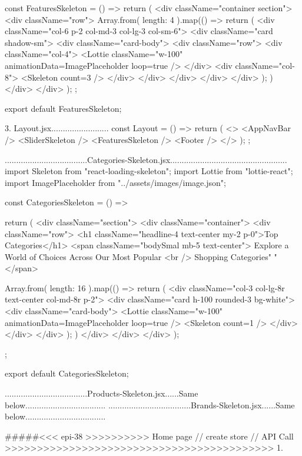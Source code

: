 const FeaturesSkeleton = () => {
  return (
    <div className="container section">
      <div className="row">
        {Array.from({ length: 4 }).map(() => {
          return (
            <div className="col-6 p-2 col-md-3 col-lg-3 col-sm-6">
              <div className="card shadow-sm">
                <div className="card-body">
                  <div className="row">
                    <div className="col-4">
                      <Lottie
                        className="w-100"
                        animationData={ImagePlaceholder}
                        loop={true}
                      />
                    </div>
                    <div className="col-8">
                      <Skeleton count={3} />
                    </div>
                  </div>
                </div>
              </div>
            </div>
          );
        })}
      </div>
    </div>
  );
};

export default FeaturesSkeleton;

3. Layout.jsx.........................
const Layout = () => {
  return (
    <>
      <AppNavBar />
      <SliderSkeleton />
      <FeaturesSkeleton />
      <Footer />
    </>
  );
};

....................................Categories-Skeleton.jsx...................................................
import Skeleton from "react-loading-skeleton";
import Lottie from "lottie-react";
import ImagePlaceholder from "../assets/images/image.json";

const CategoriesSkeleton = () => {
  return (
    <div className="section">
      <div className="container">
        <div className="row">
          <h1 className="headline-4 text-center my-2 p-0">Top Categories</h1>
          <span className="bodySmal mb-5 text-center">
            Explore a World of Choices Across Our Most Popular <br />
            Shopping Categories{" "}
          </span>

          {Array.from({ length: 16 }).map(() => {
            return (
              <div className="col-3 col-lg-8r text-center col-md-8r p-2">
                <div className="card h-100 rounded-3 bg-white">
                  <div className="card-body">
                    <Lottie
                      className="w-100"
                      animationData={ImagePlaceholder}
                      loop={true}
                    />
                    <Skeleton count={1} />
                  </div>
                </div>
              </div>
            );
          })}
        </div>
      </div>
    </div>
  );
};

export default CategoriesSkeleton;

....................................Products-Skeleton.jsx......Same below...................................
....................................Brands-Skeleton.jsx......Same below...................................

#####<<< epi-38 >>>>>>>>>>  Home page // create store // API Call >>>>>>>>>>>>>>>>>>>>>>>>>>>>>>>>>>>>>>>>>>
1. 